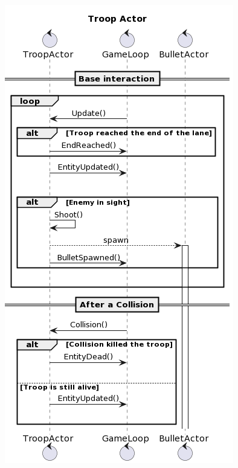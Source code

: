 \begin{figure}[H]
    \centering
    \includegraphics[width=\linewidth]{images/troop-actor.png}
    \label{Diagramma di sequenza del Troop Actor.}
\end{figure}

